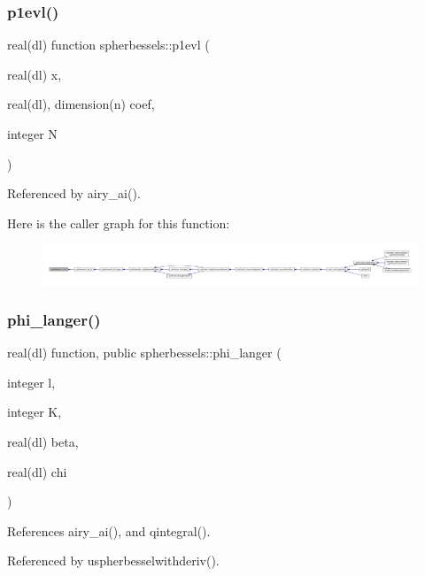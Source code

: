 \subsubsection{\texorpdfstring{p1evl()}{p1evl()}}
{\footnotesize\ttfamily real(dl) function spherbessels\+::p1evl (\begin{DoxyParamCaption}\item[{real(dl)}]{x,  }\item[{real(dl), dimension(n)}]{coef,  }\item[{integer}]{N }\end{DoxyParamCaption})\hspace{0.3cm}{\ttfamily [private]}}



Referenced by airy\+\_\+ai().

Here is the caller graph for this function\+:
\nopagebreak
\begin{figure}[H]
\begin{center}
\leavevmode
\includegraphics[width=350pt]{namespacespherbessels_a193e3d6761bf168624e2532123ccec2b_icgraph}
\end{center}
\end{figure}
\mbox{\label{namespacespherbessels_ac93cf86caa7e4d63b164799492196aba}} 
\subsubsection{\texorpdfstring{phi\+\_\+langer()}{phi\_langer()}}
{\footnotesize\ttfamily real(dl) function, public spherbessels\+::phi\+\_\+langer (\begin{DoxyParamCaption}\item[{integer}]{l,  }\item[{integer}]{K,  }\item[{real(dl)}]{beta,  }\item[{real(dl)}]{chi }\end{DoxyParamCaption})}



References airy\+\_\+ai(), and qintegral().



Referenced by uspherbesselwithderiv().

